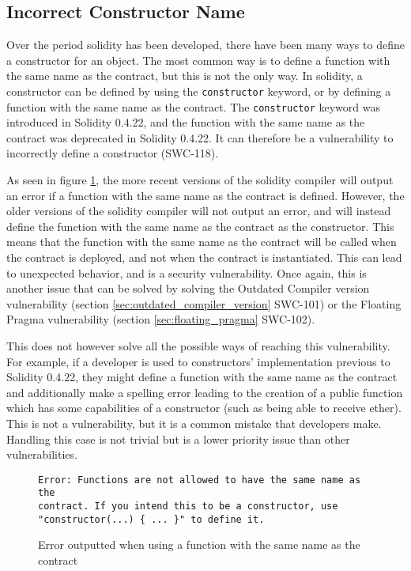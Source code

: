 \subsection{Incorrect Constructor Name}
\label{sec:incorrect_constructor_name}

Over the period solidity has been developed, there have been many ways to define a constructor for an object. The most common way is to define a function with the same name as the contract, but this is not the only way. In solidity, a constructor can be defined by using the \verb|constructor| keyword, or by defining a function with the same name as the contract. The \verb|constructor| keyword was introduced in Solidity 0.4.22, and the function with the same name as the contract was deprecated in Solidity 0.4.22. It can therefore be a vulnerability to incorrectly define a constructor (SWC-118).

As seen in figure \ref{fig:incorrect_constructor_name}, the more recent versions of the solidity compiler will output an error if a function with the same name as the contract is defined. However, the older versions of the solidity compiler will not output an error, and will instead define the function with the same name as the contract as the constructor. This means that the function with the same name as the contract will be called when the contract is deployed, and not when the contract is instantiated. This can lead to unexpected behavior, and is a security vulnerability. Once again, this is another issue that can be solved by solving the Outdated Compiler version vulnerability (section \ref{sec:outdated_compiler_version} SWC-101) or the Floating Pragma vulnerability (section \ref{sec:floating_pragma} SWC-102).

This does not however solve all the possible ways of reaching this vulnerability. For example, if a developer is used to constructors' implementation previous to Solidity 0.4.22, they might define a function with the same name as the contract and additionally make a spelling error leading to the creation of a public function which has some capabilities of a constructor (such as being able to receive ether). This is not a vulnerability, but it is a common mistake that developers make. Handling this case is not trivial but is a lower priority issue than other vulnerabilities.

\begin{figure}
\begin{lstlisting}
Error: Functions are not allowed to have the same name as the
contract. If you intend this to be a constructor, use
"constructor(...) { ... }" to define it. 
\end{lstlisting}
\caption{Error outputted when using a function with the same name as the contract}
\label{fig:incorrect_constructor_name}
\end{figure}

